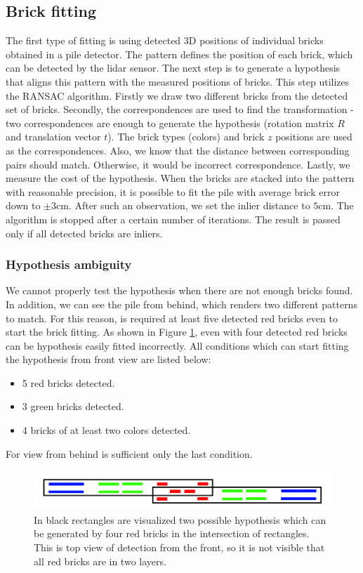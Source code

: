 \subsection{Brick fitting}
The first type of fitting is using detected 3D positions of individual bricks obtained in a pile detector. The pattern defines the position of each brick, which can be detected by the lidar sensor. The next step is to generate a hypothesis that aligns this pattern with the measured positions of bricks. This step utilizes the RANSAC algorithm. Firstly we draw two different bricks from the detected set of bricks. Secondly, the correspondences are used to find the transformation - two correspondences are enough to generate the hypothesis (rotation matrix $R$ and translation vector $t$). The brick types (colors) and brick $z$ positions are used as the correspondences. Also, we know that the distance between corresponding pairs should match. Otherwise, it would be incorrect correspondence. Lastly, we measure the cost of the hypothesis. When the bricks are stacked into the pattern with reasonable precision, it is possible to fit the pile with average brick error down to $\pm 3$cm. After such an observation, we set the inlier distance to $5$cm. The algorithm is stopped after a certain number of iterations. The result is passed only if all detected bricks are inliers.

\subsubsection{Hypothesis ambiguity}
We cannot properly test the hypothesis when there are not enough bricks found. In addition, we can see the pile from behind, which renders two different patterns to match. For this reason, is required at least five detected red bricks even to start the brick fitting. As shown in Figure \ref{fig:ambiguity}, even with four detected red bricks can be hypothesis easily fitted incorrectly. All conditions which can start fitting the hypothesis from front view are listed below:
\begin{itemize}
\item 5 red bricks detected.
\item 3 green bricks detected.
\item 4 bricks of at least two colors detected.
\end{itemize}
For view from behind is sufficient only the last condition.
\begin{figure}[H]
\centering
\includegraphics[scale=0.3]{fig/ambiguous.png}
\caption[Hypothesis ambiguity]{In black rectangles are visualized two possible hypothesis which can be generated by four red bricks in the intersection of rectangles. This is top view of detection from the front, so it is not visible that all red bricks are in two layers.}
\label{fig:ambiguity}
\end{figure}

